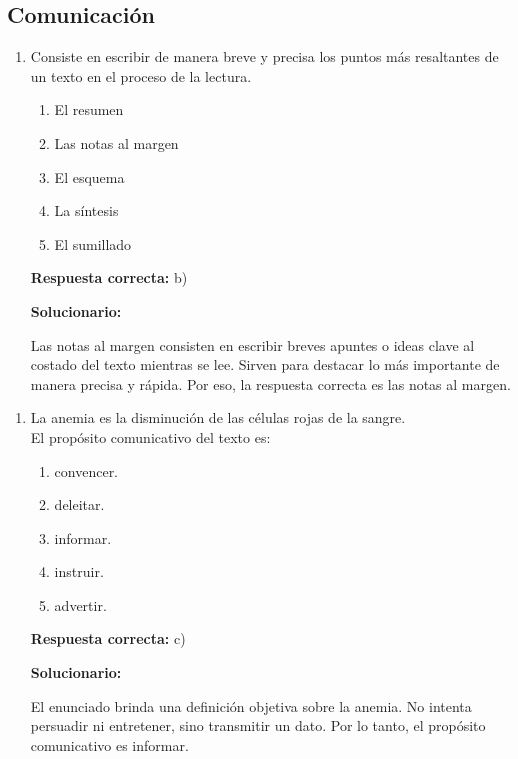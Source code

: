 \subsection*{Comunicación}

\begin{enumerate}
	
	\item Consiste en escribir de manera breve y precisa los puntos más resaltantes de un texto en el proceso de la lectura.
	
	\begin{enumerate}[label=\alph*)]
		\item El resumen
		\item Las notas al margen
		\item El esquema
		\item La síntesis
		\item El sumillado
	\end{enumerate}
	
	\textbf{Respuesta correcta:} b)
	
	\vspace{2mm}
	\textbf{Solucionario:}
	
	Las notas al margen consisten en escribir breves apuntes o ideas clave al costado del texto mientras se lee. Sirven para destacar lo más importante de manera precisa y rápida. Por eso, la respuesta correcta es las notas al margen.
	
\end{enumerate}

\begin{enumerate}[resume]
	
	\item La anemia es la disminución de las células rojas de la sangre.\\
	El propósito comunicativo del texto es:
	
	\begin{enumerate}[label=\alph*)]
		\item convencer.
		\item deleitar.
		\item informar.
		\item instruir.
		\item advertir.
	\end{enumerate}
	
	\textbf{Respuesta correcta:} c)
	
	\vspace{2mm}
	\textbf{Solucionario:}
	
	El enunciado brinda una definición objetiva sobre la anemia. No intenta persuadir ni entretener, sino transmitir un dato. Por lo tanto, el propósito comunicativo es informar.
	
\end{enumerate}

